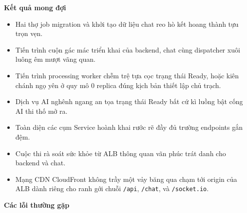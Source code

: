 \begin{Shaded}
\begin{Highlighting}[]
 
\end{Highlighting}
\end{Shaded}

\begin{Shaded}
\begin{Highlighting}[]
 
\end{Highlighting}
\end{Shaded}

\vspace{0.5em}\noindent\textbf{Kết quả mong đợi}\par

\begin{itemize}
\tightlist
\item
  Hai thợ job migration và khởi tạo dữ liệu chat reo hò kết hoang thành
  tựu trọn vẹn.
\item
  Tiến trình cuộn gác mác triển khai của backend, chat cùng dispatcher
  xuôi luông êm mượt vãng quan.
\item
  Tiến trình processing worker chễm trệ tựa cọc trạng thái Ready, hoặc
  kiên chánh ngọ yên ở quy mô 0 replica đúng kịch bản thiết lập chủ
  trạch.
\item
  Dịch vụ AI nghênh ngang an tọa trạng thái Ready bất cứ kì luồng bật
  cống AI thi thố mở ra.
\item
  Toàn diện các cụm Service hoành khai rước rẽ đầy đủ trường endpoints
  gắn đệm.
\item
  Cuộc thi rà soát sức khỏe từ ALB thông quan vãn phúc trát danh cho
  backend và chat.
\item
  Mạng CDN CloudFront không trầy một vảy băng qua chạm tới origin của
  ALB dành riêng cho ranh gới chuỗi \texttt{/\allowbreak{}api}, \texttt{/\allowbreak{}chat}, và
  \texttt{/\allowbreak{}socket.\allowbreak{}io}.
\end{itemize}

\vspace{0.5em}\noindent\textbf{Các lỗi thường
gặp}\par

